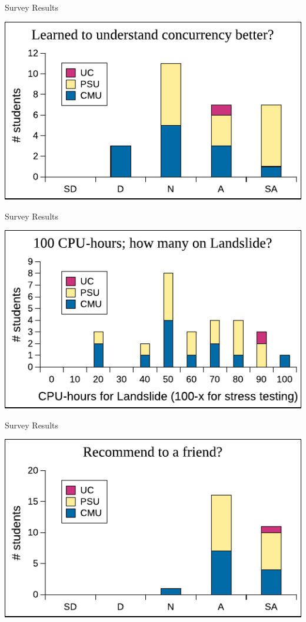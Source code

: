 \documentclass[xcolor=dvipsnames]{beamer}
\begin{document}
\begin{frame}{Survey Results} %
	\begin{center}
		\includegraphics[width=\textwidth]{../survey8.pdf} %
	\end{center}
\end{frame}

\begin{frame}{Survey Results} %
	\begin{center}
		\includegraphics[width=\textwidth]{../survey9.pdf} %
	\end{center}
\end{frame}

\begin{frame}{Survey Results} %
	\begin{center}
		\includegraphics[width=\textwidth]{../survey10.pdf} %
	\end{center}
\end{frame}
\end{document}
